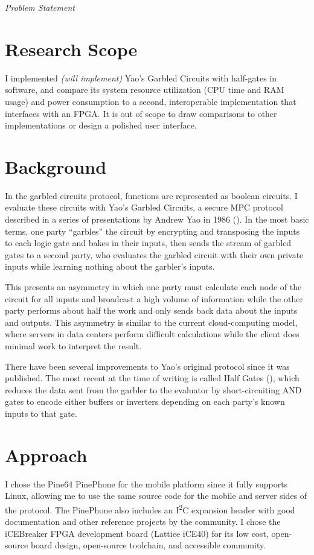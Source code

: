 \documentclass[letterpaper]{article}
\newcommand{\comment}[1]{{\color{red}\textit{#1}}}
\newcommand{\ISquaredC}{I\textsuperscript{2}C}
\begin{document}
\comment{Problem Statement}

\section{Research Scope}
I implemented \comment{(will implement)} Yao's Garbled Circuits with half-gates in software, and compare its system resource utilization (CPU time and RAM usage) and power consumption to a second, interoperable implementation that interfaces with an FPGA\@. It is out of scope to draw comparisons to other implementations or design a polished user interface.

\section{Background}
In the garbled circuits protocol, functions are represented as boolean circuits. I evaluate these circuits with Yao's Garbled Circuits, a secure MPC protocol described in a series of presentations by Andrew Yao in 1986 (\cite{YaoGC}). In the most basic terms, one party ``garbles'' the circuit by encrypting and transposing the inputs to each logic gate and bakes in their inputs, then sends the stream of garbled gates to a second party, who evaluates the garbled circuit with their own private inputs while learning nothing about the garbler's inputs.

This presents an asymmetry in which one party must calculate each node of the circuit for all inputs and broadcast a high volume of information while the other party performs about half the work and only sends back data about the inputs and outputs. This asymmetry is similar to the current cloud-computing model, where servers in data centers perform difficult calculations while the client does minimal work to interpret the result.

There have been several improvements to Yao's original protocol since it was published. The most recent at the time of writing is called Half Gates (\cite{HalfGates}), which reduces the data sent from the garbler to the evaluator by short-circuiting AND gates to encode either buffers or inverters depending on each party's known inputs to that gate.

\section{Approach}
I chose the Pine64 PinePhone for the mobile platform since it fully supports Linux, allowing me to use the same source code for the mobile and server sides of the protocol. The PinePhone also includes an \ISquaredC{} expansion header with good documentation and other reference projects by the community. I chose the iCEBreaker FPGA development board (Lattice iCE40) for its low cost, open-source board design, open-source toolchain, and accessible community.
\end{document}
